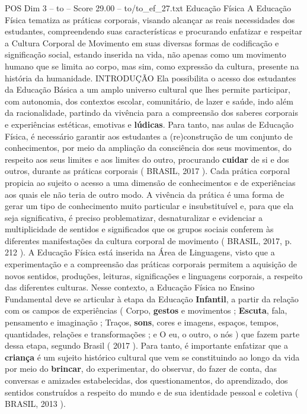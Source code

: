 \begin{textsample}{POS Dim 3 – to – Score 29.00 – to/to\_ef\_27.txt}  \label{ex:f3_pos_102}
Educação Física A Educação Física tematiza as práticas corporais, visando alcançar as reais necessidades dos estudantes, compreendendo suas características e procurando enfatizar e respeitar a Cultura Corporal de Movimento em suas diversas formas de codificação e significação social, estando inserida na vida, não apenas como um movimento humano que se limita ao corpo, mas sim, como expressão da cultura, presente na história da humanidade.
INTRODUÇÃO Ela possibilita o acesso dos estudantes da Educação Básica a um amplo universo cultural que lhes permite participar, com autonomia, dos contextos escolar, comunitário, de lazer e saúde, indo além da racionalidade, partindo da vivência para a compreensão dos saberes corporais e experiências estéticas, emotivas e \textbf{lúdicas}.
Para tanto, nas aulas de Educação Física, é necessário garantir aos estudantes a (re)construção de um conjunto de conhecimentos, por meio da ampliação da consciência dos seus movimentos, do respeito aos seus limites e aos limites do outro, procurando \textbf{cuidar} de si e dos outros, durante as práticas corporais ( BRASIL, 2017 ).
Cada prática corporal propicia ao sujeito o acesso a uma dimensão de conhecimentos e de experiências aos quais ele não teria de outro modo.
A vivência da prática é uma forma de gerar um tipo de conhecimento muito particular e insubstituível e, para que ela seja significativa, é preciso problematizar, desnaturalizar e evidenciar a multiplicidade de sentidos e significados que os grupos sociais conferem às diferentes manifestações da cultura corporal de movimento ( BRASIL, 2017, p. 212 ).
A Educação Física está inserida na Área de Linguagens, visto que a experimentação e a compreensão das práticas corporais permitem a aquisição de novos sentidos, produções, leituras, significações e linguagens corporais, a respeito das diferentes culturas.
Nesse contexto, a Educação Física no Ensino Fundamental deve se articular à etapa da Educação \textbf{Infantil}, a partir da relação com os campos de experiências ( Corpo, \textbf{gestos} e movimentos ; \textbf{Escuta}, fala, pensamento e imaginação ; Traços, \textbf{sons}, cores e imagens, espaços, tempos, quantidades, relações e transformações ; e O eu, o outro, o nós ) que fazem parte dessa etapa, segundo Brasil ( 2017 ).
Para tanto, é importante enfatizar que a \textbf{criança} é um sujeito histórico cultural que vem se constituindo ao longo da vida por meio do \textbf{brincar}, do experimentar, do observar, do fazer de conta, das conversas e amizades estabelecidas, dos questionamentos, do aprendizado, dos sentidos construídos a respeito do mundo e de sua identidade pessoal e coletiva ( BRASIL, 2013 ).

\end{textsample}
